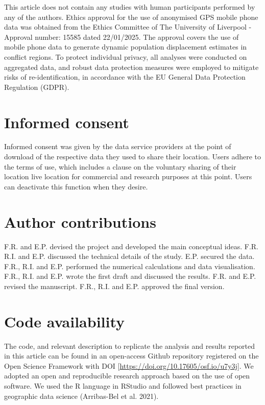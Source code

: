 \documentclass[
  sn-nature,
  11pt,
]{sn-jnl}
\begin{document}
This article does not contain any studies with human participants
performed by any of the authors. Ethics approval for the use of
anonymised GPS mobile phone data was obtained from the Ethics Committee
of The University of Liverpool - Approval number: 15585 dated
22/01/2025. The approval covers the use of mobile phone data to generate
dynamic population displacement estimates in conflict regions. To
protect individual privacy, all analyses were conducted on aggregated
data, and robust data protection measures were employed to mitigate
risks of re-identification, in accordance with the EU General Data
Protection Regulation (GDPR).

\section{Informed consent}\label{informed-consent}

Informed consent was given by the data service providers at the point of
download of the respective data they used to share their location. Users
adhere to the terms of use, which includes a clause on the voluntary
sharing of their location live location for commercial and research
purposes at this point. Users can deactivate this function when they
desire.

\section{Author contributions}\label{author-contributions}

F.R. and E.P. devised the project and developed the main conceptual
ideas. F.R. R.I. and E.P. discussed the technical details of the study.
E.P. secured the data. F.R., R.I. and E.P. performed the numerical
calculations and data visualisation. F.R., R.I. and E.P. wrote the first
draft and discussed the results. F.R. and E.P. revised the manuscript.
F.R., R.I. and E.P. approved the final version.~

\section{Code availability}\label{code-availability}

The code, and relevant description to replicate the analysis and results
reported in this article can be found in an open-access Github
repository registered on the Open Science Framework with DOI
{[}\href{https://doi.org/10.17605/OSF.IO/U7Y3J}{https://doi.org/10.17605/osf.io/u7y3j}{]}.
We adopted an open and reproducible research approach based on the use
of open software. We used the R language in RStudio and followed best
practices in geographic data science (Arribas-Bel et al. 2021).
\end{document}

